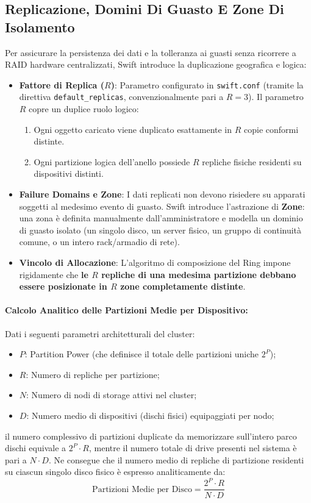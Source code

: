 \documentclass[11pt, a4paper]{article}
\begin{document}
\subsection{Replicazione, Domini Di Guasto E Zone Di Isolamento}

Per assicurare la persistenza dei dati e la tolleranza ai guasti senza ricorrere a RAID hardware centralizzati, Swift introduce la duplicazione geografica e logica:
\begin{itemize}
    \item \textbf{Fattore di Replica ($R$)}: Parametro configurato in \texttt{swift.conf} (tramite la direttiva \texttt{default\_replicas}, convenzionalmente pari a $R = 3$). Il parametro $R$ copre un duplice ruolo logico:
    \begin{enumerate}
        \item Ogni oggetto caricato viene duplicato esattamente in $R$ copie conformi distinte.
        \item Ogni partizione logica dell'anello possiede $R$ repliche fisiche residenti su dispositivi distinti.
    \end{enumerate}
    \item \textbf{Failure Domains e Zone}: I dati replicati non devono risiedere su apparati soggetti al medesimo evento di guasto. Swift introduce l'astrazione di \textbf{Zone}: una zona è definita manualmente dall'amministratore e modella un dominio di guasto isolato (un singolo disco, un server fisico, un gruppo di continuità comune, o un intero rack/armadio di rete).
    \item \textbf{Vincolo di Allocazione}: L'algoritmo di composizione del Ring impone rigidamente che \textbf{le $R$ repliche di una medesima partizione debbano essere posizionate in $R$ zone completamente distinte}.
\end{itemize}

\paragraph{Calcolo Analitico delle Partizioni Medie per Dispositivo:}
Dati i seguenti parametri architetturali del cluster:
\begin{itemize}[noitemsep]
    \item $P$: Partition Power (che definisce il totale delle partizioni uniche $2^P$);
    \item $R$: Numero di repliche per partizione;
    \item $N$: Numero di nodi di storage attivi nel cluster;
    \item $D$: Numero medio di dispositivi (dischi fisici) equipaggiati per nodo;
\end{itemize}
il numero complessivo di partizioni duplicate da memorizzare sull'intero parco dischi equivale a $2^P \cdot R$, mentre il numero totale di drive presenti nel sistema è pari a $N \cdot D$. Ne consegue che il numero medio di repliche di partizione residenti su ciascun singolo disco fisico è espresso analiticamente da:
\begin{equation}
    \boxed{\text{Partizioni Medie per Disco} = \frac{2^P \cdot R}{N \cdot D}}
\end{equation}
\end{document}
